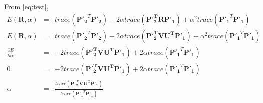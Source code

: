 \documentclass[11pt]{article}
\begin{document}
From \ref{eq:test},\\
\begin{eqnarray*}
E(\boldsymbol{R}, \alpha) &=& trace(\boldsymbol{P'_2}^T\boldsymbol{P'_2}) - 2\alpha trace(\boldsymbol{P'^T_2RP'_1}) + \alpha^2 trace(\boldsymbol{P'_1}^T\boldsymbol{P'_1})\\
E(\boldsymbol{R}, \alpha) &=& trace(\boldsymbol{P'_2}^T\boldsymbol{P'_2}) - 2\alpha trace(\boldsymbol{P'^T_2VU^TP'_1}) + \alpha^2 trace(\boldsymbol{P'_1}^T\boldsymbol{P'_1})\\
\frac{\partial E}{\partial \boldsymbol{\alpha}} &=& - 2 trace(\boldsymbol{P'^T_2VU^TP'_1}) + 2\alpha trace(\boldsymbol{P'_1}^T\boldsymbol{P'_1}) \\
0 &=& - 2 trace(\boldsymbol{P'^T_2VU^TP'_1}) + 2\alpha trace(\boldsymbol{P'_1}^T\boldsymbol{P'_1}) \\
\alpha &=& \frac{trace(\boldsymbol{P'^T_2VU^TP'_1})}{trace(\boldsymbol{P'_1}^T\boldsymbol{P'_1})}
\end{eqnarray*}
\end{document}
